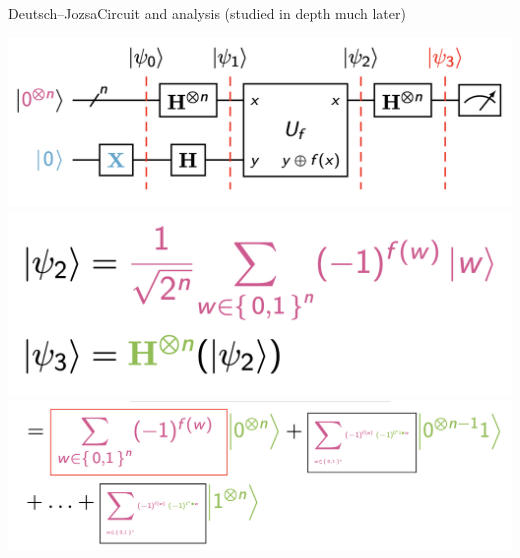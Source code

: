 \begin{frame}{Deutsch--Jozsa}{Circuit and analysis (studied in depth much later)}
\Vskip{-3.8em}\begin{center}
    \includegraphics[scale=0.27]{000/djacircuit.png} \\
    \includegraphics[scale=0.25]{000/math1.png} \\
    \includegraphics[scale=0.27]{000/math2.png}
\end{center}
\end{frame}

